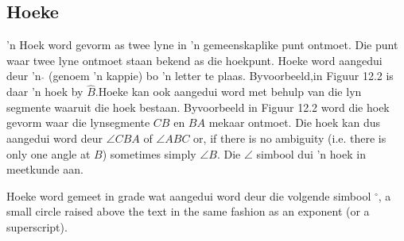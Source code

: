 % 
% 
\subsection*{Hoeke}
\nopagebreak
’n Hoek word gevorm as twee lyne in ’n gemeenskaplike punt ontmoet. Die punt waar twee lyne ontmoet staan
bekend as die hoekpunt. Hoeke word aangedui deur ’n $\hat{}$ (genoem ’n kappie) bo ’n letter te plaas. Byvoorbeeld,in Figuur 12.2 is daar ’n hoek by $\hat{B}$.Hoeke kan ook aangedui word met behulp van die lyn segmente waaruit die hoek bestaan. Byvoorbeeld in Figuur 12.2 word die hoek gevorm waar die lynsegmente $CB$ en $BA$ mekaar
ontmoet. Die hoek kan dus aangedui word deur $\angle CBA$ of $\angle ABC$ or, if there is no ambiguity (i.e. there is only one angle at $B$) sometimes simply $\angle B$. Die $\angle $ simbool dui ’n hoek in meetkunde aan.\par 
Hoeke word gemeet in grade wat aangedui word deur die volgende simbool $^{\circ }$, a small circle raised above the text in the same fashion as an exponent (or a superscript).\par 

